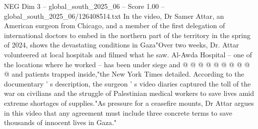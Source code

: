 \begin{textsample}{NEG Dim 3 – global\_south\_2025\_06 – Score 1.00 – global\_south\_2025\_06/126408514.txt}
In the video, Dr Samer Attar, an American surgeon from Chicago, and a member of the first delegation of international doctors to embed in the northern part of the territory in the spring of 2024, shows the devastating conditions in Gaza"Over two weeks, Dr.
Attar volunteered at local hospitals and filmed what he saw.
Al-Awda Hospital -- one of the locations where he worked -- has been under siege and @ @ @ @ @ @ @ @ @ @ and patients trapped inside,"the New York Times detailed.
According to the documentary ' s description, the surgeon ' s video diaries captured the toll of the war on civilians and the struggle of Palestinian medical workers to save lives amid extreme shortages of supplies."As pressure for a ceasefire mounts, Dr Attar argues in this video that any agreement must include three concrete terms to save thousands of innocent lives in Gaza."

\end{textsample}

